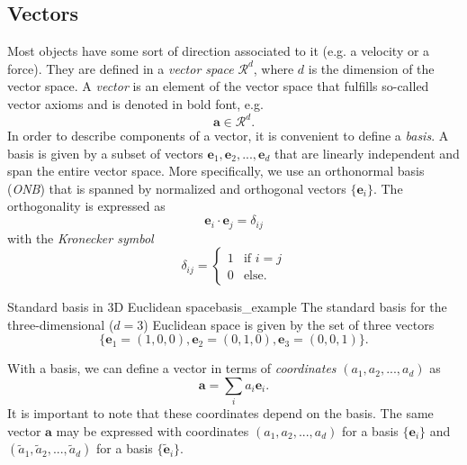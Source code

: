 \subsection{Vectors}
Most objects have some sort of direction associated to it (e.g. a velocity or a force). They are defined in a \emph{vector space} 
$\mathcal{R}^d$, where $d$ is the dimension of the vector space. A \emph{vector} is an element of the vector space that fulfills so-called vector axioms and is denoted in bold font, e.g. 
\begin{equation}
    \textbf{a} \in \mathcal{R}^d.
\end{equation}
In order to describe components of a vector, it is convenient to define a \emph{basis}. A basis is given by a subset of vectors ${\mathbf{e}_1,\mathbf{e}_2,...,\mathbf{e}_d}$ that are linearly independent and span the entire vector space.
More specifically, we use an orthonormal basis (\emph{ONB}) that is spanned by normalized and orthogonal vectors $\{\mathbf{e}_i\}$. The orthogonality is expressed as  
\begin{equation}
    \label{eq:orthogonality}
    \mathbf{e}_i \cdot \mathbf{e}_j = \delta_{ij}
\end{equation}
with the \emph{Kronecker symbol} 
\begin{equation}
    \delta_{ij} = 
    \begin{cases}
    1 & \text{if }  i=j \\
    0 & \text{else}.
    \end{cases}
\end{equation}

\begin{example}{Standard basis in 3D Euclidean space}{basis_example}
    The standard basis for the three-dimensional ($d=3$) Euclidean space is given by the set of three vectors
    \begin{equation}
        \{\mathbf{e}_1=(1,0,0), \mathbf{e}_2=(0,1,0), \mathbf{e}_3=(0,0,1)\}.
    \end{equation}
\end{example}

With a basis, we can define a vector in terms of \emph{coordinates} $(a_1, a_2, ..., a_d)$ as 
\begin{equation}
    \label{eq:coordinates}
    \mathbf{a} = \sum_i a_i \mathbf{e}_i. 
\end{equation}
It is important to note that these coordinates depend on the basis. The same vector $\mathbf{a}$ may be expressed with coordinates $(a_1, a_2, ..., a_d)$ for a basis $\{\mathbf{e}_i\}$ and $(\tilde{a}_1, \tilde{a}_2, ..., \tilde{a}_d)$ for a basis $\{\tilde{\mathbf{e}}_i\}$. 

